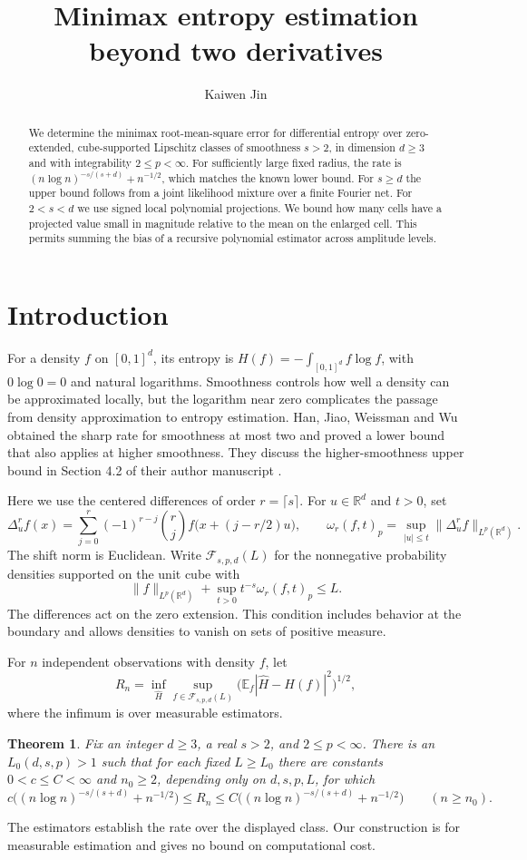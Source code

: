 \documentclass[11pt,reqno]{amsart}
\title{Minimax entropy estimation beyond two derivatives}
\author{Kaiwen Jin}
\newtheorem{theorem}{Theorem}
\numberwithin{equation}{section}
\newcommand{\R}{\mathbb R}
\newcommand{\E}{\mathbb E}
\newcommand{\cF}{\mathcal F}
\begin{document}
\begin{abstract}
We determine the minimax root-mean-square error for differential
entropy over zero-extended, cube-supported Lipschitz classes of
smoothness \(s>2\), in dimension \(d\ge3\) and with integrability
\(2\le p<\infty\). For sufficiently large fixed radius, the rate is
\((n\log n)^{-s/(s+d)}+n^{-1/2}\), which matches the known lower
bound. For \(s\ge d\) the upper bound follows from a joint likelihood
mixture over a finite Fourier net. For \(2<s<d\) we use signed
local polynomial projections. We bound how many cells have a projected value small in magnitude
relative to the mean on the enlarged cell. This permits summing
the bias of a recursive polynomial estimator across amplitude levels.
\end{abstract}
\maketitle
\section{Introduction}
For a density \(f\) on \([0,1]^d\), its entropy is
\(H(f)=-\int_{[0,1]^d} f\log f\), with \(0\log 0=0\) and natural
logarithms. Smoothness controls how well a density can be
approximated locally, but the logarithm near zero complicates the
passage from density approximation to entropy estimation.
Han, Jiao, Weissman and Wu \cite[Theorem~1, p.~3229]{HJWW} obtained the sharp rate for
smoothness at most two and proved a lower bound that also applies
at higher smoothness. They discuss the higher-smoothness upper
bound in Section 4.2 of their author manuscript \cite{HJWWv4}.

Here we use the centered differences of order \(r=\lceil s\rceil\).
For \(u\in\R^d\) and \(t>0\), set
\[
 \Delta_u^r f(x)=\sum_{j=0}^r(-1)^{r-j}\binom rj
    f\bigl(x+(j-r/2)u\bigr),\qquad
 \omega_r(f,t)_p=\sup_{|u|\le t}\|\Delta_u^r f\|_{L^p(\R^d)} .
\]
The shift norm is Euclidean. Write \(\cF_{s,p,d}(L)\) for the
nonnegative probability densities supported on the unit cube with
\[
 \|f\|_{L^p(\R^d)}+\sup_{t>0}t^{-s}\omega_r(f,t)_p\le L .
\]
The differences act on the zero extension. This condition includes
behavior at the boundary and allows densities to vanish on sets of
positive measure.

For \(n\) independent observations with density \(f\), let
\[
 R_n=\inf_{\widehat H}\sup_{f\in\cF_{s,p,d}(L)}
          \bigl(\E_f|\widehat H-H(f)|^2\bigr)^{1/2},
\]
where the infimum is over measurable estimators.
\begin{theorem}\label{thm:main}
Fix an integer \(d\ge3\), a real \(s>2\), and \(2\le p<\infty\).
There is an \(L_0(d,s,p)>1\) such that for each fixed \(L\ge L_0\)
there are constants \(0<c\le C<\infty\) and \(n_0\ge2\), depending
only on \(d,s,p,L\), for which
\[
 c\bigl((n\log n)^{-s/(s+d)}+n^{-1/2}\bigr)
 \le R_n\le
 C\bigl((n\log n)^{-s/(s+d)}+n^{-1/2}\bigr)
 \qquad(n\ge n_0).
\]
\end{theorem}
The estimators establish the rate over the displayed class. Our
construction is for measurable estimation and gives no bound on
computational cost.
\end{document}
